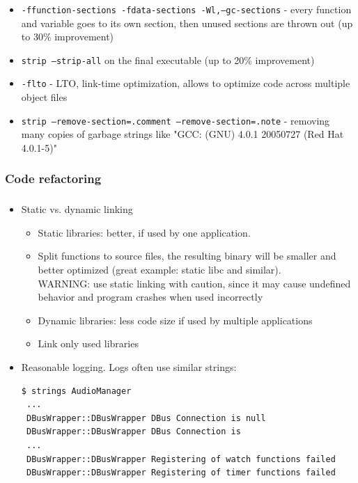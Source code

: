 \documentclass{beamer}
\newcommand{\codeinline}[1] {\texttt{\small #1}}
\begin{document}
\begin{frame}
\frametitle{\subsubsecname}
\begin{itemize}
\item \codeinline{-ffunction-sections -fdata-sections -Wl,--gc-sections} - every function and variable goes to its own section, then unused sections are thrown out (up to 30\% improvement)
\item \codeinline{strip --strip-all} on the final executable (up to 20\% improvement)
\item \codeinline{-flto} - LTO, link-time optimization, allows to optimize code across multiple object files
\item \codeinline{strip --remove-section=.comment --remove-section=.note} - removing many copies of garbage strings like "GCC: (GNU) 4.0.1 20050727 (Red Hat 4.0.1-5)"
\end{itemize}
\end{frame}

\subsubsection{Code refactoring}

\begin{frame}
\frametitle{\subsubsecname}
\begin{itemize}
    \item Static vs. dynamic linking
    \begin{itemize} 
    	\item Static libraries: better, if used by one application. 
    	\item Split functions to source files, the resulting binary will be smaller and better optimized (great example: static libc and similar). \\ WARNING: use static linking with caution, since it may cause undefined behavior and program crashes when used incorrectly
    	\item Dynamic libraries: less code size if used by multiple applications
        \item Link only used libraries
	\end{itemize}
\small
\end{itemize}
\end{frame}

\begin{frame}[fragile]
\begin{itemize}
    \item Reasonable logging. Logs often use similar strings:
\begin{verbatim}
$ strings AudioManager
 ...
 DBusWrapper::DBusWrapper DBus Connection is null
 DBusWrapper::DBusWrapper DBus Connection is
 ...
 DBusWrapper::DBusWrapper Registering of watch functions failed
 DBusWrapper::DBusWrapper Registering of timer functions failed
\end{verbatim}
\normalsize
\end{itemize}
\end{frame}
\end{document}
